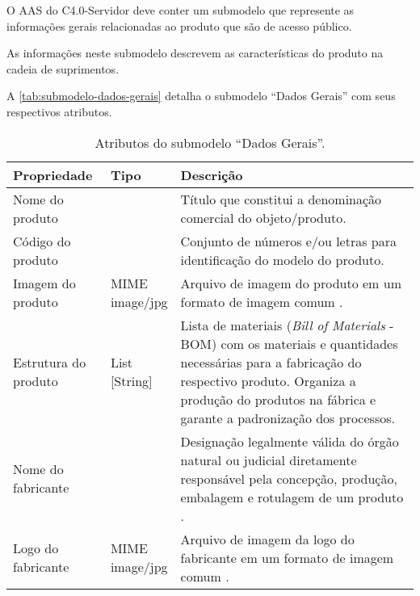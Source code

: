 O AAS do C4.0-Servidor deve conter um submodelo que represente as informações gerais relacionadas ao produto que são de acesso público.

As informações neste submodelo descrevem as características do produto na cadeia de suprimentos.

A \autoref{tab:submodelo-dados-gerais} detalha o submodelo ``Dados Gerais'' com seus respectivos atributos.

\begin{table}[htb]
	\centering
	\caption{Atributos do submodelo ``Dados Gerais''.}
	\begin{tabular}{p{3.5cm}p{1.5cm}p{9cm}}
		\hline
		\textbf{Propriedade}
		 & \textbf{Tipo}
		 & \textbf{Descrição}                                                                                                                                                                                                           \\

		\hline
		Nome do produto
		 & \makecell{String}
		 & Título que constitui a denominação comercial do objeto/produto.
		\\

		\hline
		Código do produto
		 & \makecell{String}
		 & Conjunto de números e/ou letras para identificação do modelo do produto.
		\\

		\hline
		Imagem do produto
		 & \makecell{MIME\\{image/jpg}}
		 & Arquivo de imagem do produto em um formato de imagem comum \cite{bader2020submodel}.
		\\

		\hline
		Estrutura do produto
		 & \makecell{List\\{[String]}}
		 & Lista de materiais (\textit{Bill of Materials} - BOM) com os materiais e quantidades necessárias para a fabricação do respectivo produto. Organiza a produção do produtos na fábrica e garante a padronização dos processos. \\


		\hline
		Nome do fabricante
		 & \makecell{String}
		 & Designação legalmente válida do órgão natural ou judicial diretamente responsável pela concepção, produção, embalagem e rotulagem de um produto \cite{bader2020submodel}.
		\\

		\hline
		Logo do fabricante
		 & \makecell{MIME\\{image/jpg}}
		 & Arquivo de imagem da logo do fabricante em um formato de imagem comum \cite{bader2020submodel}.
		\\

		\hline
	\end{tabular}
	\label{tab:submodelo-dados-gerais}
\end{table}

